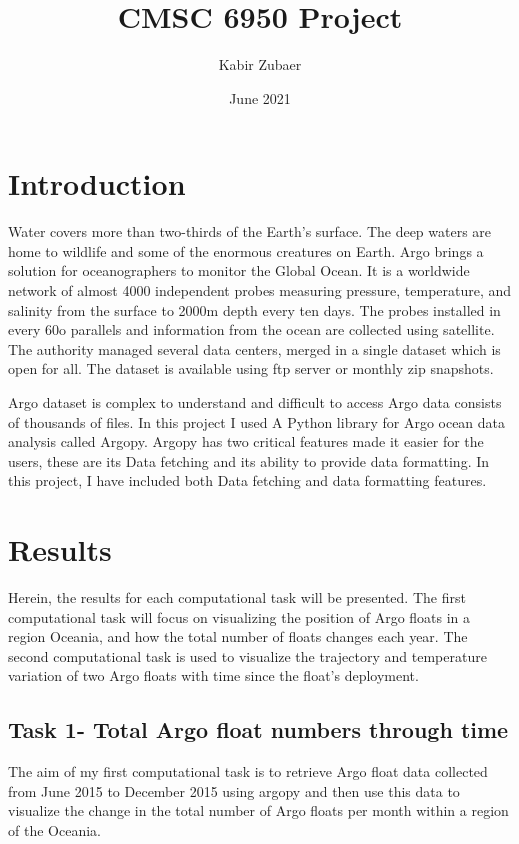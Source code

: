 \documentclass[12pt]{article}
\title{CMSC 6950 Project}
\date{June 2021}
\author{Kabir Zubaer}
\begin{document}
\maketitle
\section{Introduction}

Water covers more than two-thirds of the Earth’s surface. The deep waters are home to wildlife and some of the enormous creatures on Earth. Argo brings a solution for oceanographers to monitor the Global Ocean. It is a worldwide network of almost 4000 independent probes measuring pressure, temperature, and salinity from the surface to 2000m depth every ten days. The probes installed in every 60o parallels and information from the ocean are collected using satellite. The authority managed several data centers, merged in a single dataset which is open for all. The dataset is available using ftp server or monthly zip snapshots.

Argo dataset is complex to understand and difficult to access Argo data consists of thousands of files. In this project I used A Python library for Argo ocean data analysis called Argopy. Argopy has two critical features made it easier for the users, these are its Data fetching and its ability to provide data formatting. In this project, I have included both Data fetching and data formatting features. 

\section{Results}

Herein, the results for each computational task will be presented. The first computational task will focus on visualizing the position of Argo floats in a region Oceania,  and how the total number of floats changes each year. The second computational task is used to visualize the trajectory and temperature variation of two Argo floats with time since the float's deployment.
  
\subsection{Task 1- Total Argo float numbers through time}
The aim of my first computational task is to retrieve Argo float data collected from June 2015 to December 2015 using argopy and then use this data to visualize the change in the total number of Argo floats per month within a region of the Oceania.  
\end{document}
